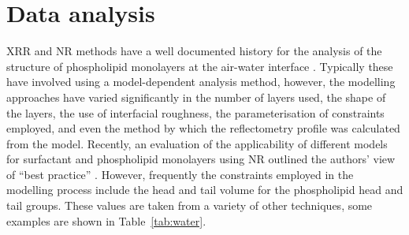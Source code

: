 \section{Data analysis}
\label{refl1:anal}
XRR and NR methods have a well documented history for the analysis of the structure of phospholipid monolayers at the air-water interface \cite{mohwald_phospholipid_1990,kewalramani_effects_2010,bayerl_specular_1990,johnson_structure_1991,clifton_role_2012,helm_phospholipid_1987,daillant_x-ray_1990}.
Typically these have involved using a model-dependent analysis method, however, the modelling approaches have varied significantly in the number of layers used, the shape of the layers, the use of interfacial roughness, the parameterisation of constraints employed, and even the method by which the reflectometry profile was calculated from the model.
Recently, an evaluation of the applicability of different models for surfactant and phospholipid monolayers using NR outlined the authors' view of ``best practice'' \cite{campbell_structure_2018}.
However, frequently the constraints employed in the modelling process include the head and tail volume for the phospholipid head and tail groups.
These values are taken from a variety of other techniques, some examples are shown in Table~\ref{tab:water}.
%
